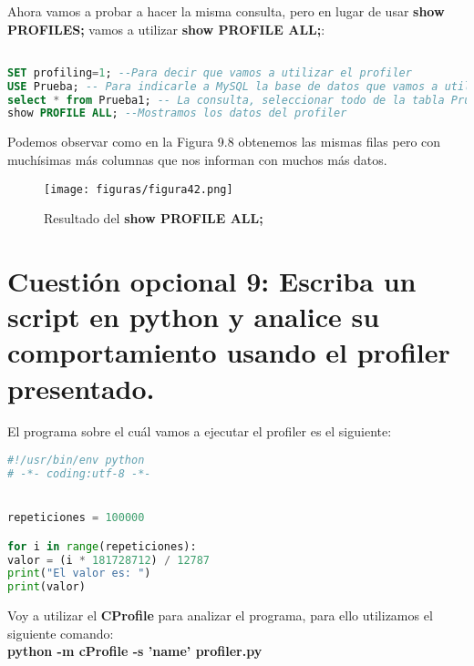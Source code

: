 Ahora vamos a probar a hacer la misma consulta, pero en lugar de usar \textbf{show PROFILES;} vamos a utilizar \textbf{show PROFILE ALL;}:\\

\begin{lstlisting}[language=SQL]

SET profiling=1; --Para decir que vamos a utilizar el profiler
USE Prueba; -- Para indicarle a MySQL la base de datos que vamos a utilizar
select * from Prueba1; -- La consulta, seleccionar todo de la tabla Prueba1
show PROFILE ALL; --Mostramos los datos del profiler

\end{lstlisting}

Podemos observar como en la Figura 9.8 obtenemos las mismas filas pero con muchísimas más columnas que nos informan con muchos más datos.

\begin{figure}[H] %
	\centering
	\texttt{[image: figuras/figura42.png]}  %
	\label{figura42}
	
	\caption{Resultado del \textbf{show PROFILE ALL;}} 
\end{figure}
\section{Cuestión opcional 9: Escriba un script en python y analice su comportamiento usando el profiler presentado.}
El programa sobre el cuál vamos a ejecutar el profiler es el siguiente:\\

\begin{lstlisting}[language=python]
#!/usr/bin/env python
# -*- coding:utf-8 -*-


repeticiones = 100000

for i in range(repeticiones):
valor = (i * 181728712) / 12787
print("El valor es: ")
print(valor)

\end{lstlisting}

Voy a utilizar el \textbf{CProfile} \cite{pprofiler} para analizar el programa, para ello utilizamos el siguiente comando:\\
\textbf{python -m cProfile  -s 'name'  profiler.py}\\

